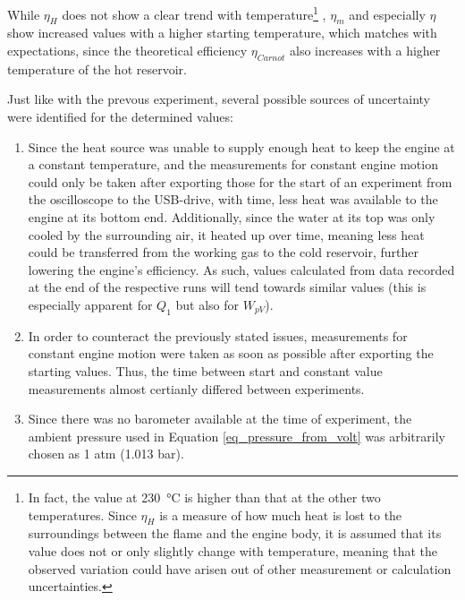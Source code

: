 \documentclass[titlepage]{article}
\begin{document}
While \(\eta_H\) does not show a clear trend with temperature\footnote{In fact, the value at 230~°C is higher than that at the other two temperatures. Since \(\eta_H\) is a measure of how much heat is lost to the surroundings between the flame and the engine body, it is assumed that its value does not or only slightly change with temperature, meaning that the observed variation could have arisen out of other measurement or calculation uncertainties.}
, \(\eta_m\) and especially \(\eta\) show increased values with a higher starting temperature, which matches with expectations, since the theoretical efficiency \(\eta_{Carnot}\) also increases with a higher temperature of the hot reservoir.

Just like with the prevous experiment, several possible sources of uncertainty were identified for the determined values:
\begin{enumerate}
    \item Since the heat source was unable to supply enough heat to keep the engine at a constant temperature, and the measurements for constant engine motion could only be taken after exporting those for the start of an experiment from the oscilloscope to the USB-drive, with time, less heat was available to the engine at its bottom end. Additionally, since the water at its top was only cooled by the surrounding air, it heated up over time, meaning less heat could be transferred from the working gas to the cold reservoir, further lowering the engine's efficiency. As such, values calculated from data recorded at the end of the respective runs will tend towards similar values (this is especially apparent for \(Q_1\) but also for \(W_{pV}\)).
    \item In order to counteract the previously stated issues, measurements for constant engine motion were taken as soon as possible after exporting the starting values. Thus, the time between start and constant value measurements almost certianly differed between experiments.
    \item Since there was no barometer available at the time of experiment, the ambient pressure used in Equation \ref{eq_pressure_from_volt} was arbitrarily chosen as 1 atm (1.013 bar).
\end{enumerate}
\end{document}
